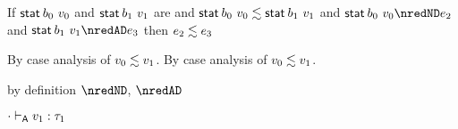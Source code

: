 \begin{lemma}\label{H-sta-A-sta}
  If\/ ${\mathsf{stat}^{}\,b_0~v_0}$
  and\/ ${\mathsf{stat}^{}\,b_1~v_1}$ are \reducedsurfaceexpressions{}
  and\/ $\mathsf{stat}^{}\,b_0~v_0 \lesssim \mathsf{stat}^{}\,b_1~v_1$
  and\/ ${\estab{\sbnd_0}{\svalue_0}} \nredND \sexpr_2$
  and\/ ${\estab{\sbnd_1}{\svalue_1}} \nredAD \sexpr_3$
  then\/ $e_2 \lesssim e_3$
\end{lemma}{
  \newcommand{\shortpf}{By case analysis of $\rexpr{\svalue_0}{\svalue_1}$.}
\begin{lamportproof*}
  \shortpf
\mainproof
  \shortpf

    \begin{pfproof}
        \begin{pfproof}
          by definition $\nredND$, $\nredAD$
        \end{pfproof}
      \qedstep
    \end{pfproof}

    \begin{pfproof}
      \absurdstep
        \begin{pfproof}
          ${\cdot} \vdash_{\mathsf{A}} v_1 : \tau_1$
        \end{pfproof}
    \end{pfproof}


\end{lamportproof*}}
